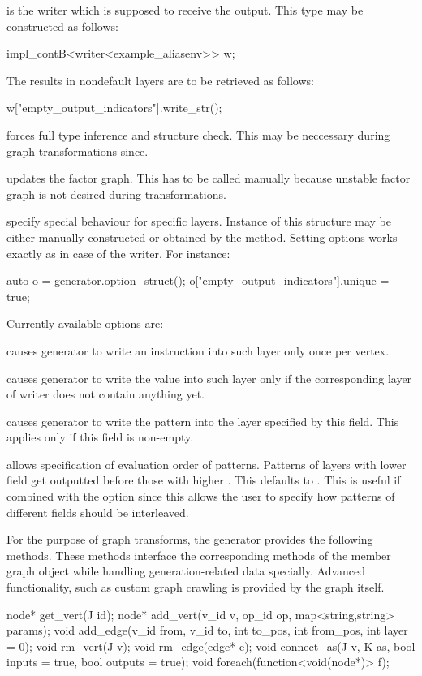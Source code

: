 \begin{description}
\item {} is the writer which is supposed to receive the output. This type may be constructed as follows:
\begin{code}
impl_contB<writer<example_aliasenv>> w;
\end{code}
 The results in nondefault layers are to be retrieved as follows:
\begin{code}
w["empty_output_indicators"].write_str();
\end{code}
\item {} forces full type inference and structure check. This may be neccessary during graph transformations since.
\item {} updates the factor graph. This has to be called manually because unstable factor graph is not desired during transformations.
\item {} specify special behaviour for specific layers. Instance of this structure may be either manually constructed or obtained by the  method. Setting options works exactly as in case of the writer. For instance:
\begin{code}
auto o = generator.option_struct();
o["empty_output_indicators"].unique = true;
\end{code}
Currently available options are:
\begin{description}
\item {} causes generator to write an instruction into such layer only once per vertex.
\item {} causes generator to write the value into such layer only if the corresponding layer of writer does not contain anything yet.
\item {} causes generator to write the pattern into the layer specified by this field. This applies only if this field is non-empty.
\item {} allows specification of evaluation order of patterns. Patterns of layers with lower  field get outputted before those with higher . This defaults to . This is useful if combined with the  option since this allows the user to specify how patterns of different fields should be interleaved. 
\end{description}
\end{description}

For the purpose of graph transforms, the generator provides the following methods. These methods interface the corresponding methods of the member graph object while handling generation-related data specially. Advanced functionality, such as custom graph crawling is provided by the graph itself.
\begin{code}
node* get_vert(J id);
node* add_vert(v_id v, op_id op, map<string,string> params);
void add_edge(v_id from, v_id to, int to_pos, int from_pos, int layer = 0);
void rm_vert(J v);
void rm_edge(edge* e);
void connect_as(J v, K as, bool inputs = true, bool outputs = true);
void foreach(function<void(node*)> f);
\end{code}

